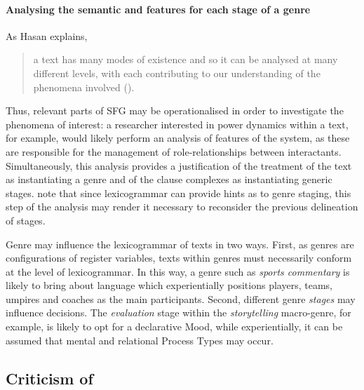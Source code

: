 \paragraph{Analysing the semantic and  features for each stage of a genre}

As Hasan explains,

\begin{quote}\singlespacing\small
a text has many modes of existence and so it can be analysed at many different levels, with each contributing to our understanding of the phenomena involved (\citeyear[p.~116]{halliday_language_1989}).
\end{quote}
%
\noindent Thus, relevant parts of \gls{SFG} may be operationalised in order to investigate the phenomena of interest: a researcher interested in power dynamics within a text, for example, would likely perform an analysis of features of the  system, as these are responsible for the management of role\hyp{}relationships between interactants. Simultaneously, this analysis provides a justification of the treatment of the text as instantiating a genre and of the clause complexes as instantiating generic stages. \textcite{eggins_analysing_2004} note that since \gls{lexicogrammar} can provide hints as to genre staging, this step of the analysis may render it necessary to reconsider the previous delineation of stages.

Genre may influence the \gls{lexicogrammar} of texts in two ways. First, as genres are configurations of register variables, texts within genres must necessarily conform at the level of lexicogrammar. In this way, a genre such as \emph{sports commentary} is likely to bring about language which experientially positions players, teams, umpires and coaches as the main participants. Second, different genre \emph{stages} may influence  decisions. The \emph{evaluation} stage within the \emph{storytelling} macro\hyp{}genre, for example, is likely to opt for a declarative Mood, while experientially, it can be assumed that mental and relational Process Types may occur.

\subsection{Criticism of }

